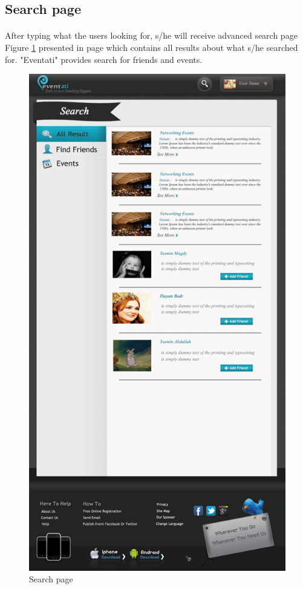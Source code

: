 \documentclass[12pt,a4paper,class,twoside,openany]{report}
\begin{document}
{\subsection{Search page}
\paragraph*{\hspace{.9 cm} } After typing what the users looking for, s/he will receive advanced search page Figure \ref{fg:6-13} presented in page \pageref{fg:6-13} which contains all results about what s/he searched for. "Eventati" provides search for friends and events. 
\begin{figure}
\begin{center}
\includegraphics[height=8.10 in]{6-13}
\caption{Search page}
\label{fg:6-13}
\end{center}
\end{figure}
}
\end{document}
